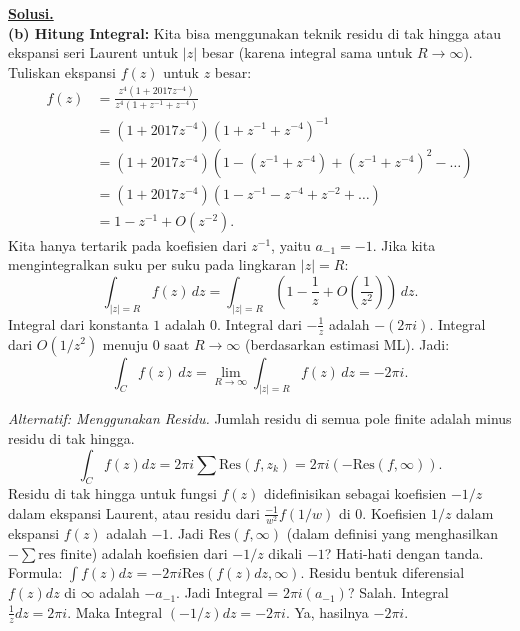 \documentclass[12pt,twoside]{article}
\newenvironment{solution}
{
	\par\noindent\textbf{\underline{Solusi.}}\\
}
{
	\par
}
\begin{document}
\begin{enumerate}
\begin{solution}
          \textbf{(b) Hitung Integral:}
          Kita bisa menggunakan teknik residu di tak hingga atau ekspansi seri Laurent untuk $|z|$ besar (karena integral sama untuk $R \to \infty$).
          Tuliskan ekspansi $f(z)$ untuk $z$ besar:
          \begin{align*}
            f(z) & = \frac{z^4(1 + 2017 z^{-4})}{z^4(1 + z^{-1} + z^{-4})}                   \\
                 & = (1 + 2017 z^{-4}) (1 + z^{-1} + z^{-4})^{-1}                            \\
                 & = (1 + 2017 z^{-4}) (1 - (z^{-1} + z^{-4}) + (z^{-1} + z^{-4})^2 - \dots) \\
                 & = (1 + 2017 z^{-4}) (1 - z^{-1} - z^{-4} + z^{-2} + \dots)                \\
                 & = 1 - z^{-1} + O(z^{-2}).
          \end{align*}
          Kita hanya tertarik pada koefisien dari $z^{-1}$, yaitu $a_{-1} = -1$.
          Jika kita mengintegralkan suku per suku pada lingkaran $|z|=R$:
          \[ \int_{|z|=R} f(z) \, dz = \int_{|z|=R} \left( 1 - \frac{1}{z} + O\left(\frac{1}{z^2}\right) \right) \, dz. \]
          Integral dari konstanta $1$ adalah 0.
          Integral dari $-\frac{1}{z}$ adalah $-(2\pi i)$.
          Integral dari $O(1/z^2)$ menuju 0 saat $R \to \infty$ (berdasarkan estimasi ML).
          Jadi:
          \[ \int_{C} f(z) \, dz = \lim_{R \to \infty} \int_{|z|=R} f(z) \, dz = -2\pi i. \]

          \textit{Alternatif: Menggunakan Residu.}
          Jumlah residu di semua pole finite adalah minus residu di tak hingga.
          \[ \int_C f(z) dz = 2\pi i \sum \text{Res}(f, z_k) = 2\pi i (- \text{Res}(f, \infty)). \]
          Residu di tak hingga untuk fungsi $f(z)$ didefinisikan sebagai koefisien $-1/z$ dalam ekspansi Laurent, atau residu dari $\frac{-1}{w^2} f(1/w)$ di 0.
          Koefisien $1/z$ dalam ekspansi $f(z)$ adalah $-1$.
          Jadi $\text{Res}(f, \infty)$ (dalam definisi yang menghasilkan $-\sum \text{res finite}$) adalah koefisien dari $-1/z$ dikali $-1$?
          Hati-hati dengan tanda.
          Formula: $\int f(z) dz = - 2\pi i \text{Res}(f(z)dz, \infty)$.
          Residu bentuk diferensial $f(z)dz$ di $\infty$ adalah $-a_{-1}$.
          Jadi Integral = $2\pi i (a_{-1}) $? Salah.
          Integral $ \frac{1}{z} dz = 2 \pi i$.
          Maka Integral $(-1/z) dz = -2 \pi i$.
          Ya, hasilnya $-2\pi i$.
        \end{solution}
\end{enumerate}
\pagebreak
\end{document}
